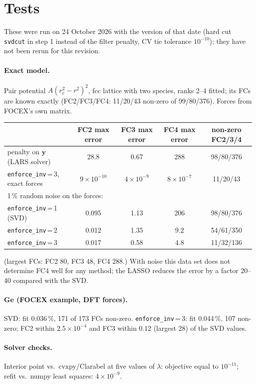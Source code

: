 \documentclass[11pt,a4paper]{article}
\newcommand{\by}{\mathbf y}
\newcommand{\code}[1]{\texttt{#1}}
\begin{document}
\section{Tests}
These were run on 24 October 2026 with the version of that date (hard cut \code{svdcut} in step 1 instead of the filter
penalty, CV tie tolerance $10^{-10}$); they have not been rerun for this revision.
\paragraph{Exact model.} Pair potential $A(r_c^2-r^2)^2$, fcc lattice with two species, ranks 2--4 fitted; its FCs are known
exactly (FC2/FC3/FC4: 11/20/43 non-zero of 99/80/376). Forces from FOCEX's own matrix.
\begin{center}\small
\begin{tabular}{lcccc}
\toprule
 & FC2 max error & FC3 max error & FC4 max error & non-zero FC2/3/4 \\
\midrule
penalty on $\by$ (LARS solver) & 28.8 & 0.67 & 288 & 98/80/376 \\
\code{enforce\_inv}\,=\,3, exact forces & $9\times10^{-10}$ & $4\times10^{-9}$ & $8\times10^{-7}$ & 11/20/43 \\
\midrule
\multicolumn{5}{l}{1\,\% random noise on the forces:}\\
\code{enforce\_inv}\,=\,1 (SVD) & 0.095 & 1.13 & 206 & 98/80/376 \\
\code{enforce\_inv}\,=\,2 & 0.012 & 1.35 & 9.2 & 54/61/350 \\
\code{enforce\_inv}\,=\,3 & 0.017 & 0.58 & 4.8 & 11/32/136 \\
\bottomrule
\end{tabular}
\end{center}
(largest FCs: FC2 80, FC3 48, FC4 288.) With noise this data set does not determine FC4 well for any method; the LASSO
reduces the error by a factor 20--40 compared with the SVD.
\paragraph{Ge (FOCEX example, DFT forces).} SVD: fit 0.036\,\%, 171 of 173 FCs non-zero. \code{enforce\_inv}\,=\,3: fit 0.044\,\%,
107 non-zero; FC2 within $2.5\times10^{-4}$ and FC3 within 0.12 (largest 28) of the SVD values.
\paragraph{Solver checks.} Interior point vs.\ cvxpy/Clarabel at five values of $\lambda$: objective equal to $10^{-11}$; refit
vs.\ numpy least squares: $4\times10^{-9}$.
\end{document}

